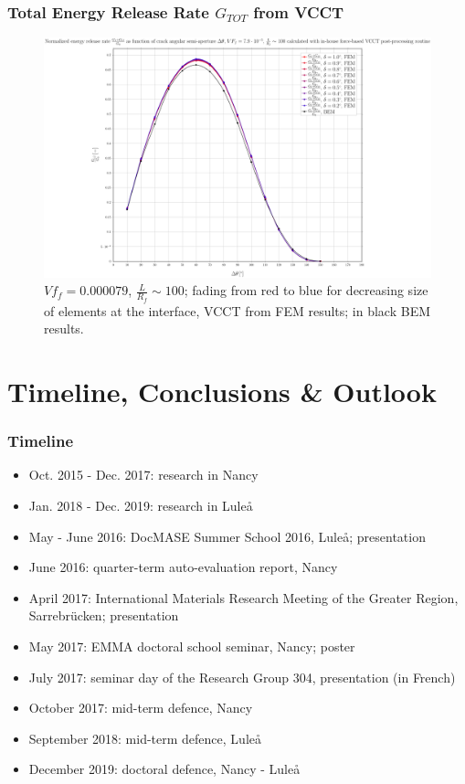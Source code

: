 \documentclass[first,firstsupp,lastsupp,last,hyperref,table]{ETHclass}
\begin{document}
\begin{frame}
\frametitle{\small Total Energy Release Rate $G_{TOT}$ from VCCT}
\vspace{-0.5cm}
\centering
\captionsetup[figure]{font=scriptsize,labelfont=scriptsize}
\begin{figure}[!h]
\centering
\includegraphics[height=0.7\textheight]{2017-07-10_AbqRunSummary_SmallStrain_M-F-VCCT_GTOT.pdf}
  \caption{\scriptsize $Vf_{f}=0.000079$, $\frac{L}{R_{f}}\sim 100$; fading from red to blue for decreasing size of elements at the interface, VCCT from FEM results; in black BEM results.}
  \label{fig:res1}
\end{figure}
\end{frame}

\section[Conclusions]{Timeline, Conclusions \& Outlook}

\begin{frame}
\frametitle{\vspace*{0.5cm} Timeline}
\vspace{-0.75cm}
\centering
\scriptsize
\begin{itemize}[label=]
\item Oct. 2015 - Dec. 2017: research in Nancy
\item Jan. 2018 - Dec. 2019: research in Lule\aa\\[20pt]
\item May - June 2016: DocMASE Summer School 2016, Lule\aa; presentation
\item June 2016: quarter-term auto-evaluation report, Nancy
\item April 2017: International Materials Research Meeting of the Greater Region, Sarrebr\"ucken; presentation
\item May 2017: EMMA doctoral school seminar, Nancy; poster
\item July 2017: seminar day of the Research Group 304, presentation (in French)
\item October 2017: mid-term defence, Nancy
\item September 2018: mid-term defence, Lule\aa
\item December 2019: doctoral defence, Nancy - Lule\aa
\end{itemize}
\end{frame}
\end{document}
